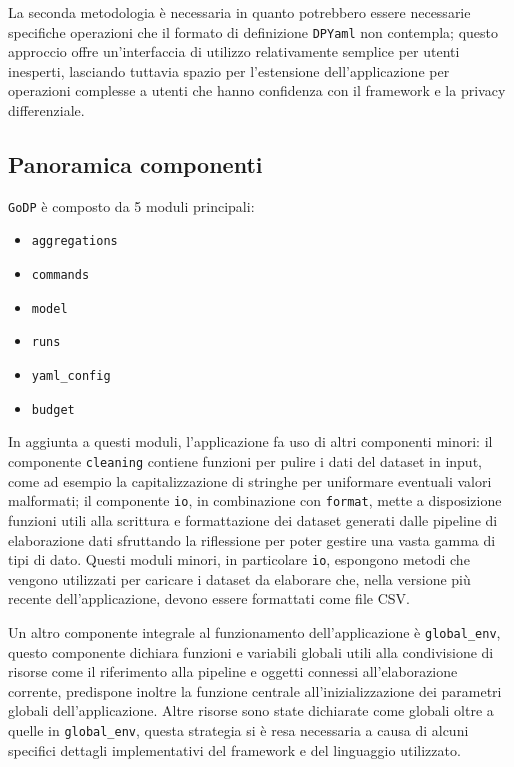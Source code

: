 La seconda metodologia è necessaria in quanto potrebbero essere necessarie specifiche operazioni che il formato di definizione \texttt{DPYaml} non contempla; questo approccio offre un'interfaccia di utilizzo relativamente semplice per utenti inesperti, lasciando tuttavia spazio per l'estensione dell'applicazione per operazioni complesse a utenti che hanno confidenza con il framework e la privacy differenziale.

\subsection{Panoramica componenti}
\texttt{GoDP} è composto da 5 moduli principali:
\begin{itemize}
    \item \texttt{aggregations}
    \item \texttt{commands}
    \item \texttt{model}
    \item \texttt{runs}
    \item \texttt{yaml\_config}
    \item \texttt{budget}
\end{itemize}

In aggiunta a questi moduli, l'applicazione fa uso di altri componenti minori: il componente \texttt{cleaning} contiene funzioni per pulire i dati del dataset in input, come ad esempio la capitalizzazione di stringhe per uniformare eventuali valori malformati; il componente \texttt{io}, in combinazione con \texttt{format}, mette a disposizione funzioni utili alla scrittura e formattazione dei dataset generati dalle pipeline di elaborazione dati sfruttando la riflessione per poter gestire una vasta gamma di tipi di dato. Questi moduli minori, in particolare \texttt{io}, espongono metodi che vengono utilizzati per caricare i dataset da elaborare che, nella versione più recente dell'applicazione, devono essere formattati come file CSV.

Un altro componente integrale al funzionamento dell'applicazione è \texttt{global\_env}, questo componente dichiara funzioni e variabili globali utili alla condivisione di risorse come il riferimento alla pipeline e oggetti connessi all'elaborazione corrente, predispone inoltre la funzione centrale all'inizializzazione dei parametri globali dell'applicazione.
Altre risorse sono state dichiarate come globali oltre a quelle in \texttt{global\_env}, questa strategia si è resa necessaria a causa di alcuni specifici dettagli implementativi del framework e del linguaggio utilizzato.

